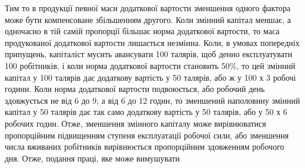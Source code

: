 Тим то в продукції певної маси додаткової вартости зменшення
одного фактора може бути компенсоване збільшенням другого.
Коли змінний капітал меншає, а одночасно в тій самій пропорції
більшає норма додаткової вартости, то маса продукованої додаткової
вартости лишається незмінна. Коли, в умовах попередніх
припущень, капіталіст мусить авансувати 100 талярів, щоб денно
експлуатувати 100 робітників, і коли норма додаткової вартости
становить 50\%, то цей змінний капітал у 100 талярів дає додаткову
вартість у 50 талярів, або ж у 100 х 3 робочі години. Коли
норма додаткової вартости подвоюється, або робочий день здовжується
не від 6 до 9, а від 6 до 12 годин, то зменшений наполовину
змінний капітал у 50 талярів дає так само додаткову
вартість у 50 талярів, або у 50 х 6 робочих годин. Отже,
зменшення змінного капіталу може вирівнюватися пропорційним
підвищенням ступеня експлуатації робочої сили, або зменшення
числа вживаних робітників вирівнюється пропорційним здовженням
робочого дня. Отже, подання праці, яке може вимушувати
\parbreak{}  %

